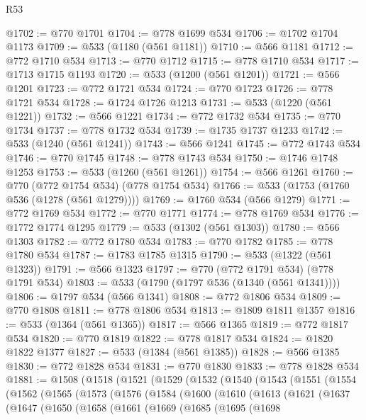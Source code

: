 \begin{lexlean}{R53}
\begin{coremodule}
@1702 := @770 @1701
@1704 := @778 @1699 @534
@1706 := @1702 @1704 @1173
@1709 := @533 (@1180 (@561 @1181))
@1710 := @566 @1181
@1712 := @772 @1710 @534
@1713 := @770 @1712
@1715 := @778 @1710 @534
@1717 := @1713 @1715 @1193
@1720 := @533 (@1200 (@561 @1201))
@1721 := @566 @1201
@1723 := @772 @1721 @534
@1724 := @770 @1723
@1726 := @778 @1721 @534
@1728 := @1724 @1726 @1213
@1731 := @533 (@1220 (@561 @1221))
@1732 := @566 @1221
@1734 := @772 @1732 @534
@1735 := @770 @1734
@1737 := @778 @1732 @534
@1739 := @1735 @1737 @1233
@1742 := @533 (@1240 (@561 @1241))
@1743 := @566 @1241
@1745 := @772 @1743 @534
@1746 := @770 @1745
@1748 := @778 @1743 @534
@1750 := @1746 @1748 @1253
@1753 := @533 (@1260 (@561 @1261))
@1754 := @566 @1261
@1760 := @770 (@772 @1754 @534) (@778 @1754 @534)
@1766 := @533 (@1753 (@1760 @536 (@1278 (@561 @1279))))
@1769 := @1760 @534 (@566 @1279)
@1771 := @772 @1769 @534
@1772 := @770 @1771
@1774 := @778 @1769 @534
@1776 := @1772 @1774 @1295
@1779 := @533 (@1302 (@561 @1303))
@1780 := @566 @1303
@1782 := @772 @1780 @534
@1783 := @770 @1782
@1785 := @778 @1780 @534
@1787 := @1783 @1785 @1315
@1790 := @533 (@1322 (@561 @1323))
@1791 := @566 @1323
@1797 := @770 (@772 @1791 @534) (@778 @1791 @534)
@1803 := @533 (@1790 (@1797 @536 (@1340 (@561 @1341))))
@1806 := @1797 @534 (@566 @1341)
@1808 := @772 @1806 @534
@1809 := @770 @1808
@1811 := @778 @1806 @534
@1813 := @1809 @1811 @1357
@1816 := @533 (@1364 (@561 @1365))
@1817 := @566 @1365
@1819 := @772 @1817 @534
@1820 := @770 @1819
@1822 := @778 @1817 @534
@1824 := @1820 @1822 @1377
@1827 := @533 (@1384 (@561 @1385))
@1828 := @566 @1385
@1830 := @772 @1828 @534
@1831 := @770 @1830
@1833 := @778 @1828 @534
@1881 := @1508
    (@1518
      (@1521
        (@1529
          (@1532
            (@1540
              (@1543
                (@1551
                  (@1554
                    (@1562
                      (@1565
                        (@1573
                          (@1576
                            (@1584
                              (@1600
                                (@1610
                                  (@1613
                                    (@1621
                                      (@1637
                                        (@1647
                                          (@1650
                                            (@1658
                                              (@1661
                                                (@1669
                                                  (@1685
                                                    (@1695
                                                      (@1698

\end{coremodule}
\end{lexlean}
